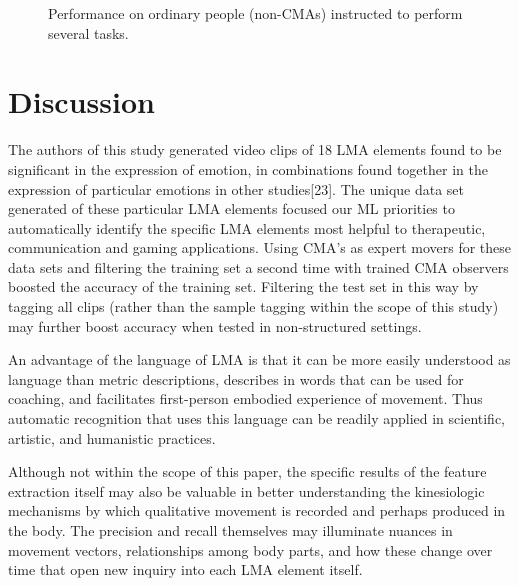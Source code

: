 \documentclass[11pt,twocolumn,varwidth=true,a4paper,fleqn]{sigchi}
\begin{document}
\begin{figure}[ht!]
\centering
{}
\caption{Performance on ordinary people (non-CMAs) instructed to
perform several tasks.}
\label{nonCMAs}
\end{figure}

\section{Discussion}
The authors of this study generated video clips of 18 LMA elements found to be significant in the expression of emotion, in combinations found together in the expression of particular emotions in other studies[23].  The unique data set generated of these particular LMA elements focused our ML priorities to automatically identify the specific LMA elements most helpful to therapeutic, communication and gaming applications.   Using CMA's as expert movers for these data sets and filtering the training set a second time with trained CMA observers boosted the accuracy of the training set.   Filtering the test set in this way by tagging all clips (rather than the sample tagging within the scope of this study) may further boost  accuracy when tested in non-structured settings.      

An advantage of the language of LMA is that it can be more easily understood as language  than metric descriptions, describes in words that can be used for coaching, and facilitates first-person embodied experience of movement. Thus automatic recognition that uses this language can be readily applied in scientific, artistic, and humanistic practices.

Although not within the scope of this paper, the specific results of the feature extraction itself may also be valuable in better understanding the kinesiologic mechanisms by which qualitative movement is recorded and perhaps produced in the body.   The precision and recall themselves may illuminate nuances in movement vectors, relationships among body parts, and how these change over time that open new inquiry into each LMA element itself. 
\end{document}
